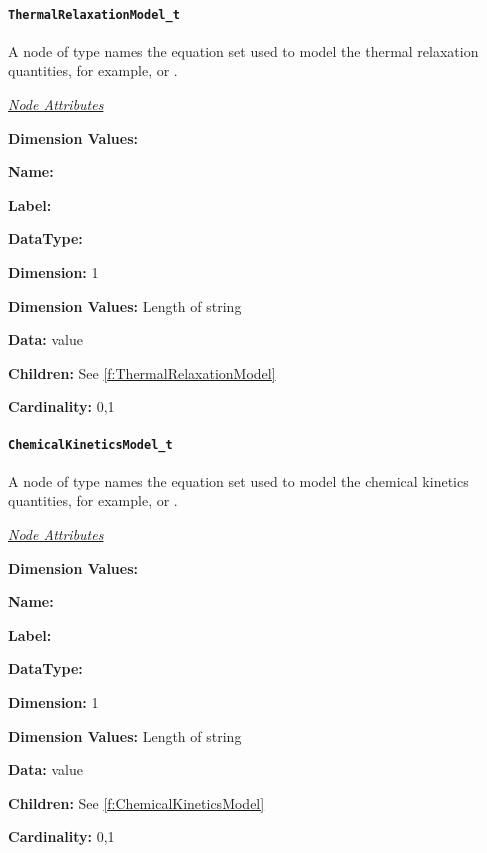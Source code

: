 \paragraph{\texttt{ThermalRelaxationModel\_t}}

A node of type  names the equation
set used to model the thermal relaxation quantities, for example,
 or .

\textit{\uline{Node Attributes}}
\begin{Ventryic}{\textbf{Dimension Values:}}
\item [\textbf{Name:}]
\item [\textbf{Label:}]
\item [\textbf{DataType:}]
\item [\textbf{Dimension:}]
      1
\item [\textbf{Dimension Values:}]
      Length of string
\item [\textbf{Data:}]
       value
\item [\textbf{Children:}]
      See \autoref{f:ThermalRelaxationModel}
\item [\textbf{Cardinality:}]
      0,1
\end{Ventryic}

\paragraph{\texttt{ChemicalKineticsModel\_t}}

A node of type  names the equation
set used to model the chemical kinetics quantities, for example,
 or .

\textit{\uline{Node Attributes}}
\begin{Ventryic}{\textbf{Dimension Values:}}
\item [\textbf{Name:}]
\item [\textbf{Label:}]
\item [\textbf{DataType:}]
\item [\textbf{Dimension:}]
      1
\item [\textbf{Dimension Values:}]
      Length of string
\item [\textbf{Data:}]
       value
\item [\textbf{Children:}]
      See \autoref{f:ChemicalKineticsModel}
\item [\textbf{Cardinality:}]
      0,1
\end{Ventryic}

